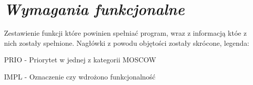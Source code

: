 \documentclass[a4paper,10pt, twoside]{report}
\newcommand{\customstylechapter}[1]{\large{\textit{#1}}}
\begin{document}
\chapter{\customstylechapter{Wymagania funkcjonalne}} 
\label{Wymagania funkcjonalne}
{Zestawienie funkcji które powinien spełniać program, wraz z informacją któe 
z nich zostały spełnione. Nagłówki z powodu objętości zostały skrócone, legenda:}

{PRIO - Priorytet w jednej z kategorii MOSCOW \cite{MOSCOW}}

{IMPL - Oznaczenie czy wdrożono funkcjonalność}

\begin{table}[h]
    \footnotesize
    \begin{tabular}{|p{0.2\linewidth}|p{0.07\linewidth}|p{0.07\linewidth}|p{0.52\linewidth}|}  %
    \hline                  %
        

\end{tabular}
\end{table}
\end{document}
